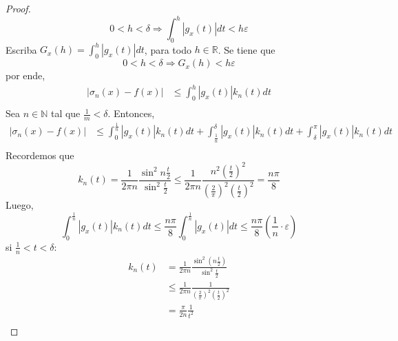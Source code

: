 \documentclass[12pt]{report}
\theoremstyle{largebreak}
\newcommand\abs[1]{\ensuremath{\left|#1\right|}}
\begin{document}
\begin{proof}
        \begin{equation*}
            0<h<\delta\Rightarrow\int_0^{h}\abs{g_x(t)}dt<h\varepsilon
        \end{equation*}
        Escriba $G_x(h)=\int_0^h \abs{g_x(t)}dt$, para todo $h\in\mathbb{R}$. Se tiene que
        \begin{equation*}
            0<h<\delta\Rightarrow G_x(h)<h\varepsilon
        \end{equation*}
        por ende,
        \begin{equation*}
            \begin{split}
                \abs{\sigma_n(x)-f(x)}&\leq\int_0^h\abs{g_x(t)}k_n(t)dt\\
            \end{split}
        \end{equation*}
        Sea $n\in\mathbb{N}$ tal que $\frac{1}{m}<\delta$. Entonces,
        \begin{equation*}
            \begin{split}
                \abs{\sigma_n(x)-f(x)}&\leq\int_0^{\frac{1}{n}}\abs{g_x(t)}k_n(t)dt+\int_{\frac{1}{n}}^\delta\abs{g_x(t)}k_n(t)dt+\int_\delta^{\pi}\abs{g_x(t)}k_n(t)dt\\
            \end{split}
        \end{equation*}
        Recordemos que
        \begin{equation*}
            k_n(t)=\frac{1}{2\pi n}\frac{\sin^2 n\frac{t}{2}}{\sin^2\frac{t}{2}}\leq\frac{1}{2\pi n}\frac{n^2\left( \frac{t}{2}\right)^2}{\left(\frac{2}{\pi} \right)^2\left(\frac{t}{2} \right)^2}=\frac{n\pi}{8}
        \end{equation*}
        Luego,
        \begin{equation*}
            \int_0^{\frac{1}{n}}\abs{g_x(t)}k_n(t)dt\leq\frac{n\pi}{8}\int_0^{\frac{1}{n}}\abs{g_x(t)}dt\leq\frac{n\pi}{8}\left(\frac{1}{n}\cdot\varepsilon \right)
        \end{equation*}
        si $\frac{1}{n}<t<\delta$:
        \begin{equation*}
            \begin{split}
                k_n(t)&=\frac{1}{2\pi n}\frac{\sin^2\left(n\frac{t}{2} \right)}{\sin^2\frac{t}{2}}\\
                &\leq\frac{1}{2\pi n}\frac{1}{\left(\frac{2}{\pi} \right)^2 \left(\frac{t}{2} \right)^2}\\
                &=\frac{\pi}{2n}\frac{1}{t^2}\\

\end{split}
\end{equation*}
\end{proof}
\end{document}
